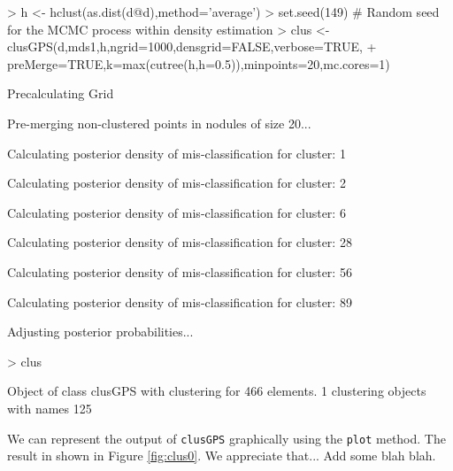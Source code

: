 \documentclass[a4paper,12pt,nogin]{article}
\newcommand{\newtext}[1]{{\color{blue} #1}} %
\newcommand{\drcomment}[1]{{\color{red} #1}} %
\begin{document}
\footnotesize
 
\begin{Schunk}
\begin{Sinput}
> h <- hclust(as.dist(d@d),method='average')
> set.seed(149) # Random seed for the MCMC process within density estimation
> clus <- clusGPS(d,mds1,h,ngrid=1000,densgrid=FALSE,verbose=TRUE,
+ preMerge=TRUE,k=max(cutree(h,h=0.5)),minpoints=20,mc.cores=1)
\end{Sinput}
\begin{Soutput}
Precalculating Grid

Pre-merging non-clustered points in nodules of size 20...

Calculating posterior density of mis-classification for cluster: 1


Calculating posterior density of mis-classification for cluster: 2


Calculating posterior density of mis-classification for cluster: 6


Calculating posterior density of mis-classification for cluster: 28


Calculating posterior density of mis-classification for cluster: 56


Calculating posterior density of mis-classification for cluster: 89


Adjusting posterior probabilities...
\end{Soutput}
\begin{Sinput}
> clus
\end{Sinput}
\begin{Soutput}
Object of class clusGPS with clustering for 466 elements. 1 clustering objects with names 125 
\end{Soutput}
\end{Schunk}

\normalsize

\newtext{We can represent the output of \texttt{clusGPS} graphically using the \texttt{plot} method.
The result in shown in Figure \ref{fig:clus0}. We appreciate that...}
\drcomment{Add some blah blah.}


\footnotesize
\begin{Schunk}
\end{Schunk}
 
\end{document}
